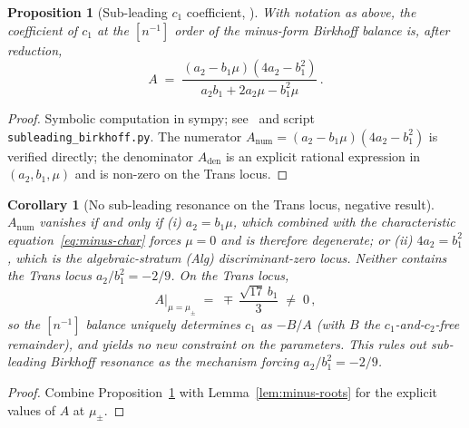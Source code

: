 \documentclass[11pt]{amsart}
\newtheorem{proposition}[theorem]{Proposition}
\newtheorem{corollary}[theorem]{Corollary}
\theoremstyle{definition}
\theoremstyle{remark}
\begin{document}
\begin{proposition}[Sub-leading $c_1$ coefficient, \cite{SprintW3Report}]
\label{prop:c1-coefficient}
With notation as above, the coefficient of $c_1$ at the $[n^{-1}]$
order of the minus-form Birkhoff balance is, after reduction,
\begin{equation}\label{eq:c1-A}
  A \;=\; \frac{(a_2 - b_1\mu)(4 a_2 - b_1^2)}%
                {a_2 b_1 + 2 a_2\mu - b_1^2\mu}\,.
\end{equation}
\end{proposition}
\begin{proof}
Symbolic computation in sympy; see~\cite[]{SprintW3Report}
and script \texttt{subleading\_birkhoff.py}.  The numerator
$A_{\text{num}} = (a_2-b_1\mu)(4 a_2 - b_1^2)$ is verified directly;
the denominator $A_{\text{den}}$ is an explicit rational
expression in $(a_2,b_1,\mu)$ and is non-zero on the Trans locus.
\end{proof}

\begin{corollary}[No sub-leading resonance on the Trans locus,
negative result]
\label{cor:no-resonance}
$A_{\text{num}}$ vanishes if and only if (i) $a_2 = b_1\mu$, which
combined with the characteristic equation~\eqref{eq:minus-char}
forces $\mu = 0$ and is therefore degenerate; or (ii)
$4 a_2 = b_1^2$, which is the algebraic-stratum (Alg)
discriminant-zero locus.  Neither contains the Trans locus
$a_2/b_1^2 = -2/9$.  On the Trans locus,
\[
  A\bigl|_{\mu = \mu_\pm}
  \;=\; \mp\,\frac{\sqrt{17}\,b_1}{3}
  \;\neq\;0\,,
\]
so the $[n^{-1}]$ balance uniquely determines $c_1$ as $-B/A$
(with $B$ the $c_1$-and-$c_2$-free remainder), and yields no new
constraint on the parameters.  This rules out sub-leading Birkhoff
resonance as the mechanism forcing $a_2/b_1^2 = -2/9$.
\end{corollary}
\begin{proof}
Combine Proposition~\ref{prop:c1-coefficient} with
Lemma~\ref{lem:minus-roots} for the explicit values of $A$ at
$\mu_\pm$.
\end{proof}
\end{document}

